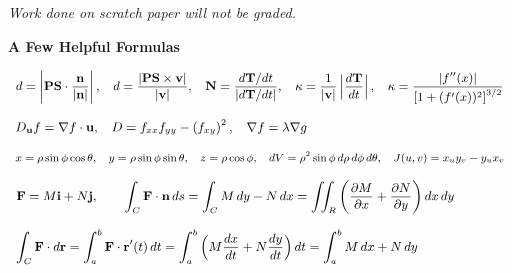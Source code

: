 \begin{center}

\textit{Work done on scratch paper will not be graded.}

\vspace{6pt}

\textbf{A Few Helpful Formulas}

\vspace{2pt}

$\small{
\begin{array}{lllllllll}
    \displaystyle d = \left| \mathbf{PS}\cdot \frac{ \mathbf n}{|\mathbf n|}\right| ,
    & \displaystyle d = \frac{|\mathbf{PS}\times \mathbf v|}{|\mathbf v|}  ,
    & \displaystyle \mathbf N = \frac{d\mathbf T/dt}{\left| d\mathbf T/dt \right|}  ,
    & \displaystyle \kappa = \frac{1}{|\mathbf v|}\left| \frac{d\mathbf T}{dt}\right|  ,
    & \displaystyle \kappa = \frac{|f''(x)|}{\left[ 1+ (f'(x))^2\right]^{3/2}} 
\end{array} 
}
$

$\small{
\begin{array}{lllllllll}
    \displaystyle D_{\mathbf u} f = \nabla f \cdot \mathbf u,
    & \displaystyle D = f_{xx}f_{yy} - \left(f_{xy}\right)^2,
    & \displaystyle \nabla f = \lambda \nabla g  
    & \ & \ 
\end{array} 
}
$

$\small{
\begin{array}{lllllllll}
    \displaystyle x = \rho \sin\phi \cos\theta,
    & \displaystyle y = \rho \sin\phi \sin\theta,
    & \displaystyle z = \rho \cos\phi,
    & \displaystyle dV = \rho^2 \sin \phi \, d\rho \, d\phi \, d\theta,
    & \displaystyle J(u,v) = x_uy_v - y_ux_v    
\end{array} 
}
$

$\small{
\begin{array}{lll}
    \mathbf{F} = M\mathbf{i} + N \mathbf{j},
    &
    &
    \displaystyle \int_C \mathbf F\cdot \mathbf n \, ds = \int_C M\,dy - N\,dx = \iint_R \left( \frac{\partial M}{\partial x} + \frac{\partial N}{\partial y} \right) dx\,dy  
\end{array} 
}
$


$\small{
\begin{array}{l}
    \displaystyle \int_C \mathbf F\cdot d\mathbf r
    = \int_a^b \mathbf F\cdot \mathbf  r'(t) \, dt 
    = \int_a^b \left( M\frac{dx}{dt} + N\frac{dy}{dt}\right) dt 
    = \int_a^b  M\,dx + N\, dy 
\end{array} 
}
$




\end{center}
